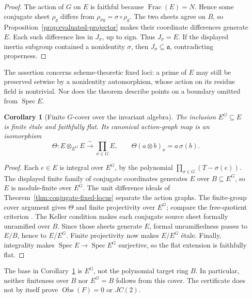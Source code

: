 \documentclass[11pt]{article}
\newtheorem{corollary}[theorem]{Corollary}
\DeclareMathOperator{\Spec}{Spec}\DeclareMathOperator{\Frac}{Frac}
\newcommand{\Obs}{\operatorname{Obs}}
\begin{document}
\begin{proof}
The action of \(G\) on \(E\) is faithful because \(\Frac(E)=N\).
Hence some conjugate sheet \(\rho_g\) differs from
\(\rho_{\sigma g}=\sigma\circ\rho_g\).  The two sheets agree on \(B\),
so Proposition~\ref{prop:evaluated-projector} makes their coordinate
differences generate \(E\).  Each such difference lies in
\(J_\sigma\), up to sign.  Thus \(J_\sigma=E\).  If the displayed
inertia subgroup contained a nonidentity \(\sigma\), then
\(J_\sigma\subseteq\mathfrak a\), contradicting properness.
\end{proof}

The assertion concerns scheme-theoretic fixed loci: a prime of \(E\)
may still be preserved setwise by a nonidentity automorphism, whose
action on its residue field is nontrivial.  Nor does the theorem describe
points on a boundary omitted from \(\Spec E\).

\begin{corollary}[Finite \(G\)-cover over the invariant algebra]
\label{cor:conjugate-cover}
The inclusion \(E^G\subseteq E\) is finite \'etale and
faithfully flat.  Its canonical action-graph map is an isomorphism
\[
  \Theta\colon E\otimes_{E^G}E\xrightarrow{\ \sim\ }
    \prod_{\sigma\in G}E,
  \qquad
  \Theta(a\otimes b)_\sigma=a\,\sigma(b).
\]
\end{corollary}

\begin{proof}
Each \(e\in E\) is integral over \(E^G\), by the polynomial
\(\prod_{\sigma\in G}(T-\sigma(e))\).  The displayed finite family of
conjugate coordinates generates \(E\) over \(B\subseteq E^G\), so
\(E\) is module-finite over \(E^G\).  The unit difference ideals of
Theorem~\ref{thm:conjugate-fixed-locus} separate the action graphs.
The finite-group cover argument gives \(\Theta\) and finite projectivity
over \(E^G\); compare the free-quotient criterion
\cite{StacksFiniteFreeQuotient}.  The Keller condition makes
each conjugate source sheet formally unramified over \(B\).  Since those
sheets generate \(E\), formal unramifiedness passes to \(E/B\), hence
to \(E/E^G\).  Finite projectivity now makes \(E/E^G\) \'etale.
Finally, integrality makes \(\Spec E\to\Spec E^G\) surjective, so the
flat extension is faithfully flat.
\end{proof}

The base in Corollary~\ref{cor:conjugate-cover} is \(E^G\), not the
polynomial target ring \(B\).  In particular, neither finiteness over
\(B\) nor \(E^G=B\) follows from this cover.  The certificate does not
by itself prove \(\Obs(F)=0\) or \(JC(2)\).
\end{document}
